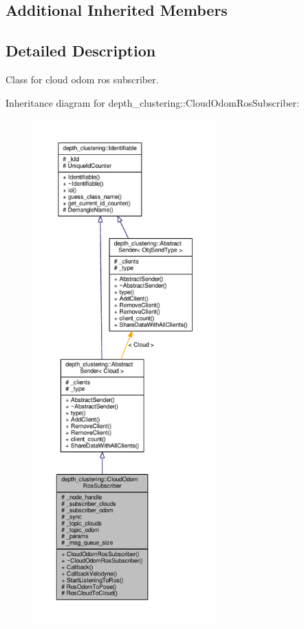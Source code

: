 \subsection*{Additional Inherited Members}


\subsection{Detailed Description}
Class for cloud odom ros subscriber. 

Inheritance diagram for depth\+\_\+clustering\+:\+:Cloud\+Odom\+Ros\+Subscriber\+:\nopagebreak
\begin{figure}[H]
\begin{center}
\leavevmode
\includegraphics[height=550pt]{classdepth__clustering_1_1CloudOdomRosSubscriber__inherit__graph}
\end{center}
\end{figure}


